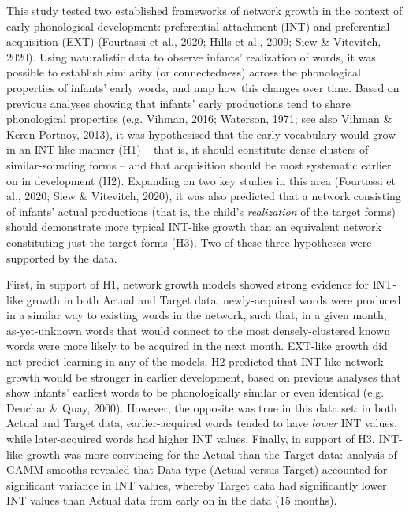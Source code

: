 \documentclass[
  man]{apa6}
\begin{document}
This study tested two established frameworks of network growth in the context of early phonological development: preferential attachment (INT) and preferential acquisition (EXT) (Fourtassi et al., 2020; Hills et al., 2009; Siew \& Vitevitch, 2020). Using naturalistic data to observe infants' realization of words, it was possible to establish similarity (or connectedness) across the phonological properties of infants' early words, and map how this changes over time. Based on previous analyses showing that infants' early productions tend to share phonological properties (e.g. Vihman, 2016; Waterson, 1971; see also Vihman \& Keren-Portnoy, 2013), it was hypothesised that the early vocabulary would grow in an INT-like manner (H1) -- that is, it should constitute dense clusters of similar-sounding forms -- and that acquisition should be most systematic earlier on in development (H2). Expanding on two key studies in this area (Fourtassi et al., 2020; Siew \& Vitevitch, 2020), it was also predicted that a network consisting of infants' actual productions (that is, the child's \emph{realization} of the target forms) should demonstrate more typical INT-like growth than an equivalent network constituting just the target forms (H3). Two of these three hypotheses were supported by the data.

First, in support of H1, network growth models showed strong evidence for INT-like growth in both Actual and Target data; newly-acquired words were produced in a similar way to existing words in the network, such that, in a given month, as-yet-unknown words that would connect to the most densely-clustered known words were more likely to be acquired in the next month. EXT-like growth did not predict learning in any of the models. H2 predicted that INT-like network growth would be stronger in earlier development, based on previous analyses that show infants' earliest words to be phonologically similar or even identical (e.g. Deuchar \& Quay, 2000). However, the opposite was true in this data set: in both Actual and Target data, earlier-acquired words tended to have \emph{lower} INT values, while later-acquired words had higher INT values. Finally, in support of H3, INT-like growth was more convincing for the Actual than the Target data: analysis of GAMM smooths revealed that Data type (Actual versus Target) accounted for significant variance in INT values, whereby Target data had significantly lower INT values than Actual data from early on in the data (15 months).
\end{document}
